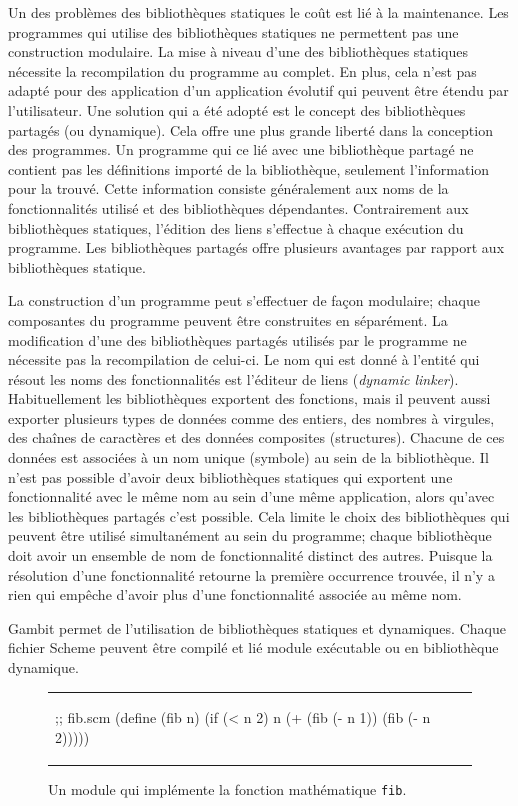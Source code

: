 Un des problèmes des bibliothèques statiques le coût est lié à la maintenance.  Les
programmes qui utilise des bibliothèques statiques ne permettent pas une
construction modulaire. La mise à niveau d'une des bibliothèques statiques
nécessite la recompilation du programme au complet. En plus, cela n'est pas
adapté pour des application d'un application évolutif qui peuvent être étendu
par l'utilisateur. Une solution qui a été adopté est le
concept des bibliothèques partagés (ou dynamique). Cela offre une plus grande
liberté dans la conception des programmes. Un programme qui ce lié avec une
bibliothèque partagé ne contient pas les définitions importé de la
bibliothèque, seulement l'information pour la trouvé. Cette information
consiste généralement aux noms de la fonctionnalités utilisé et des
bibliothèques dépendantes. Contrairement aux bibliothèques statiques,
l'édition des liens s'effectue à chaque exécution du programme.
Les bibliothèques partagés offre plusieurs avantages par rapport
aux bibliothèques statique.

La construction d'un programme peut s'effectuer de façon modulaire; chaque
composantes du programme peuvent être construites en séparément.  La
modification d'une des bibliothèques partagés utilisés par
le programme ne nécessite pas la recompilation de celui-ci. Le nom qui est
donné à l'entité qui résout les noms des fonctionnalités est l'éditeur de liens (\textit{dynamic linker}).
Habituellement les bibliothèques exportent des fonctions, mais il peuvent aussi
exporter plusieurs types de données comme des entiers, des nombres à virgules,
des chaînes de caractères et des données composites (structures). Chacune de ces données est
associées à un nom unique (symbole) au sein de la bibliothèque.
Il n'est pas possible d'avoir deux bibliothèques statiques qui exportent une
fonctionnalité avec le même nom au sein d'une même application, alors qu'avec
les bibliothèques partagés c'est possible. Cela limite le choix des
bibliothèques qui peuvent être utilisé simultanément au sein du programme;
chaque bibliothèque doit avoir un ensemble de nom de fonctionnalité distinct
des autres. Puisque la résolution d'une fonctionnalité retourne la première
occurrence trouvée, il n'y a rien qui empêche d'avoir plus d'une fonctionnalité
associée au même nom.

Gambit permet de l'utilisation de bibliothèques statiques et dynamiques.
Chaque fichier Scheme peuvent être compilé et lié module exécutable ou
en bibliothèque dynamique.

\begin{center}
\begin{figure}[ht]
  \begin{tabular}{l}
    \begin{mplisting}{0.5}
;; fib.scm
(define (fib n)
  (if (< n 2)
      n
      (+ (fib (- n 1))
         (fib (- n 2)))))
\end{mplisting}
  \end{tabular}
  \caption{Un module qui implémente la fonction mathématique \texttt{fib}.}
  \label{fig:basic_fib_module}
\end{figure}
\end{center}

